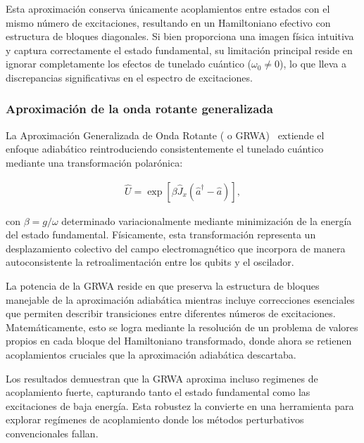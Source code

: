 \documentclass[onecolumn,notitlepage,letterpaper,aps,pra,12pt]{article}
\numberwithin{equation}{section}
\begin{document}
Esta aproximación conserva únicamente acoplamientos entre estados con el mismo número de excitaciones, resultando en un Hamiltoniano efectivo con estructura de bloques diagonales. Si bien proporciona una imagen física intuitiva y captura correctamente el estado fundamental, su limitación principal reside en ignorar completamente los efectos de tunelado cuántico ($\omega_0 \neq 0$), lo que lleva a discrepancias significativas en el espectro de excitaciones.

\subsubsection{Aproximación de la onda rotante generalizada}

La Aproximación Generalizada de Onda Rotante ( o GRWA)~\cite{irish2007,albert2011,yu2012,zhang2015,zhangyu2016,zhangyu2017}  extiende el enfoque adiabático reintroduciendo consistentemente el tunelado cuántico mediante una transformación polarónica:

\begin{gather}\label{transformation beta}
    \hat{U} = \exp\left[ \beta\hat{J}_{x}(\hat{a}^{\dagger} - \hat{a}) \right],
\end{gather}

con $\beta = g/\omega$ determinado variacionalmente mediante minimización de la energía del estado fundamental. Físicamente, esta transformación representa un desplazamiento colectivo del campo electromagnético que incorpora de manera autoconsistente la retroalimentación entre los qubits y el oscilador.

La potencia de la GRWA reside en que preserva la estructura de bloques manejable de la aproximación adiabática mientras incluye correcciones esenciales que permiten describir transiciones entre diferentes números de excitaciones. Matemáticamente, esto se logra mediante la resolución de un problema de valores propios en cada bloque del Hamiltoniano transformado, donde ahora se retienen acoplamientos cruciales que la aproximación adiabática descartaba.

Los resultados demuestran que la GRWA aproxima incluso regimenes de acoplamiento fuerte, capturando  tanto el estado fundamental como las excitaciones de baja energía. Esta robustez la convierte en una herramienta  para explorar regímenes de acoplamiento donde los métodos perturbativos convencionales fallan.
\end{document}
